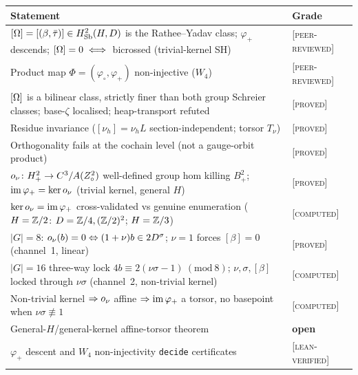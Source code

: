 \begin{center}
\begin{longtable}{@{}p{}l@{}}
\toprule
Statement & Grade \\
\midrule
\endhead
$[\Omega]=[(\beta,\bar\tau)]\in H^2_{\mathrm{Sb}}(H,D)$ is the Rathee--Yadav class; $\varphi_+$
descends; $[\Omega]=0\iff$ bicrossed (trivial-kernel SH) & \textsc{[peer-reviewed]} \\
Product map $\Phi=(\varphi_\circ,\varphi_+)$ non-injective ($W_4$) & \textsc{[peer-reviewed]} \\
$[\Omega]$ is a bilinear class, strictly finer than both group Schreier classes;
base-$\zeta$ localised; heap-transport refuted & \textsc{[proved]} \\
Residue invariance ($[\nu_h]=\nu_h L$ section-independent; torsor $T_\nu$) & \textsc{[proved]} \\
Orthogonality fails at the cochain level (not a gauge-orbit product) & \textsc{[proved]} \\
$o_\nu\colon H^2_+\to C^3/A(Z^2_\circ)$ well-defined group hom killing $B^2_+$;
$\operatorname{im}\varphi_+=\operatorname{ker}o_\nu$ (trivial kernel, general $H$) & \textsc{[proved]} \\
$\operatorname{ker}o_\nu=\operatorname{im}\varphi_+$ cross-validated vs genuine enumeration
($H=\mathbb{Z}/2$: $D=\mathbb{Z}/4,(\mathbb{Z}/2)^2$; $H=\mathbb{Z}/3$) & \textsc{[computed]} \\
$|G|=8$: $o_\nu(b)=0\Leftrightarrow(1+\nu)b\in2D^\sigma$; $\nu=1$ forces $[\beta]=0$
(channel~1, linear) & \textsc{[proved]} \\
$|G|=16$ three-way lock $4b\equiv2(\nu\sigma-1)\ (\mathrm{mod}\ 8)$; $\nu,\sigma,[\beta]$
locked through $\nu\sigma$ (channel~2, non-trivial kernel) & \textsc{[computed]} \\
Non-trivial kernel $\Rightarrow o_\nu$ affine $\Rightarrow\operatorname{im}\varphi_+$ a torsor,
no basepoint when $\nu\sigma\not\equiv1$ & \textsc{[computed]} \\
General-$H$/general-kernel affine-torsor theorem & \textbf{open} \\
$\varphi_+$ descent and $W_4$ non-injectivity \texttt{decide} certificates & \textsc{[lean-verified]} \\
\bottomrule
\end{longtable}
\end{center}

